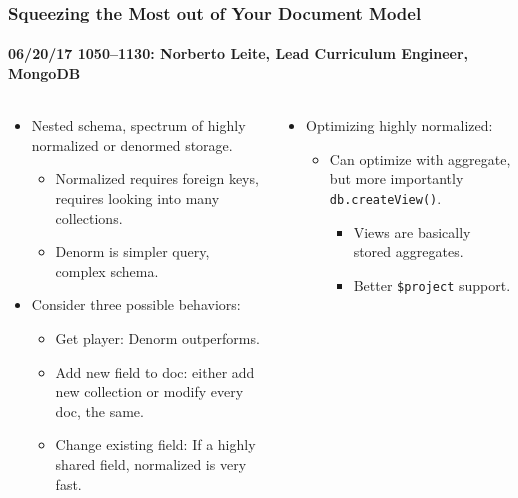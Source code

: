 \documentclass[xcolor=dvipsnames, 9pt]{beamer}
\begin{document}
\begin{frame}
    \frametitle{Squeezing the Most out of Your Document Model}
    \framesubtitle{%
        06/20/17 1050--1130:
        Norberto Leite, Lead Curriculum Engineer, MongoDB
    }
    \begin{columns}
        \begin{column}{0.5\textwidth}
            \begin{itemize}
                \item Nested schema, spectrum of highly normalized or denormed storage.
                    \begin{itemize}
                        \item Normalized requires foreign keys, requires looking
                            into many collections.
                        \item Denorm is simpler query, complex schema.
                    \end{itemize}
                \item Consider three possible behaviors:
                    \begin{itemize}
                        \item Get player: Denorm outperforms.
                        \item Add new field to doc: either add new collection
                            or modify every doc, the same.
                        \item Change existing field: If a highly shared field,
                            normalized is very fast.
                    \end{itemize}
            \end{itemize}
        \end{column}
        \begin{column}{0.5\textwidth}
            \begin{itemize}
                \item Optimizing highly normalized:
                    \begin{itemize}
                        \item Can optimize with aggregate, but more importantly
                            \texttt{db.createView()}.
                            \begin{itemize}
                                \item Views are basically stored aggregates.
                                \item Better \texttt{\$project} support.

\end{itemize}
\end{itemize}
\end{itemize}
\end{column}
\end{columns}
\end{frame}
\end{document}
